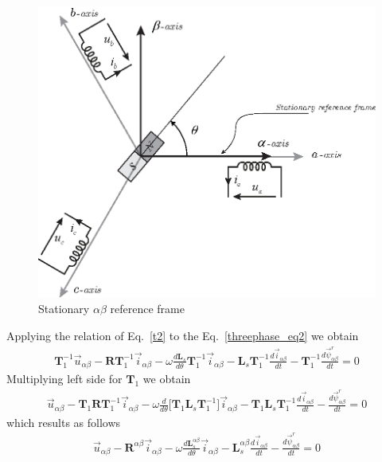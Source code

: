 \documentclass[11pt,a4paper,oneside]{book}
\numberwithin{equation}{section}
\theoremstyle{it}
\theoremstyle{definition}
\begin{document}
\begin{figure}[H]
	\centering
	\includegraphics[width = 320pt, 
	keepaspectratio]{figures/pmsm/reference_frames_ab.eps}
	\captionsetup{width=0.5\textwidth, font=small} \caption	{Stationary $\alpha\beta$ 
		reference frame}
	\label{figure_reference_frames}
\end{figure}
Applying the relation of Eq.~\ref{t2} to the Eq.~\ref{threephase_eq2} we obtain
\begin{equation*}
	\begin{aligned}
		\mathbf{T}_1^{-1}\vec{u}_{\alpha\beta}-\mathbf{R}\mathbf{T}_1^{-1} 
		\vec{i}_{\alpha\beta}-\omega\frac{d\mathbf{L}_s}{d\theta} 
		\mathbf{T}_1^{-1}\vec{i}_{\alpha\beta}-\mathbf{L}_s \mathbf{T}_1^{-1} 
		\frac{d\vec{i}_{\alpha\beta}}{dt} -\mathbf{T}_1^{-1} 
		\frac{d\vec{\psi}^r_{\alpha\beta}}{dt} = 0
	\end{aligned} 
\end{equation*}
Multiplying left side for $\mathbf{T}_1$ we obtain
\begin{equation*}
	\begin{aligned}
		\vec{u}_{\alpha\beta}-\mathbf{T}_1\mathbf{R}\mathbf{T}_1^{-1}\vec{i}_{\alpha\beta}-\omega\frac{d}{d\theta}\Big[\mathbf{T}_1\mathbf{L}_s\mathbf{T}_1^{-1}\Big]\vec{i}_{\alpha\beta}-\mathbf{T}_1\mathbf{L}_s\mathbf{T}_1^{-1}\frac{d\vec{i}_{\alpha\beta}}{dt}-\frac{d\vec{\psi}^r_{\alpha\beta}}{dt}
		= 0
	\end{aligned} 
\end{equation*}
which results as follows
\begin{equation}
	\begin{aligned}
		\vec{u}_{\alpha\beta}-\mathbf{R}^{\alpha\beta}\vec{i}_{\alpha\beta}-\omega\frac{d\mathbf{L}_s^{\alpha\beta}}{d\theta}\vec{i}_{\alpha\beta}-\mathbf{L}_s^{\alpha\beta}\frac{d\vec{i}_{\alpha\beta}}{dt}-\frac{d\vec{\psi}^r_{\alpha\beta}}{dt}
		= 0
	\end{aligned} 
\end{equation}
\end{document}
